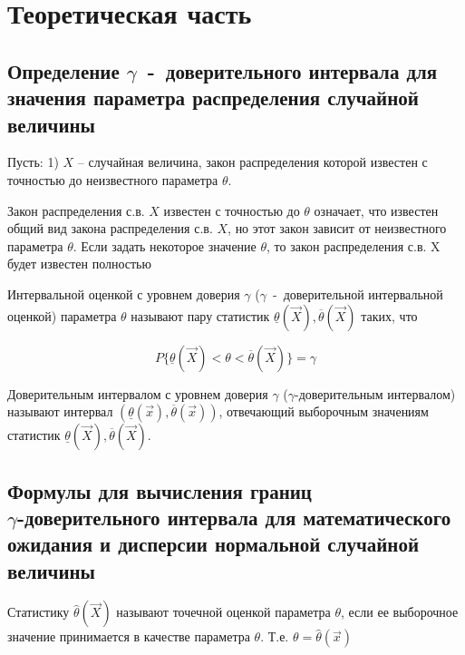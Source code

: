 \chapter{Теоретическая часть}

\section{Определение $\gamma$~-~доверительного интервала для значения параметра распределения случайной величины}

Пусть:
1) $X$ -- случайная величина, закон распределения которой
известен с точностью до неизвестного параметра $\theta$.

Закон распределения с.в. $X$ известен с точностью до $\theta$
означает, что известен общий вид закона распределения с.в. $X$, но этот закон
зависит от неизвестного параметра $\theta$.
Если задать некоторое значение $\theta$, 
то закон распределения с.в. X будет известен полностью

Интервальной оценкой с уровнем доверия $\gamma$ 
($\gamma$~-~доверительной интервальной оценкой) 
параметра $\theta$ называют пару статистик 
$\underline{\theta}(\vec X), \overline{\theta}(\vec X)$ таких, что

\begin{equation*}
    P\{\underline{\theta}(\vec X)<\theta<\overline{\theta}(\vec X)\}=\gamma
\end{equation*}


Доверительным интервалом с уровнем доверия $\gamma$ ($\gamma$-доверительным интервалом) называют интервал $(\underline{\theta}(\vec x), \overline{\theta}(\vec x))$, отвечающий выборочным значениям статистик $\underline{\theta}(\vec X), \overline{\theta}(\vec X)$.

\section{Формулы для вычисления границ \\ $\gamma$-доверительного интервала для математического ожидания и дисперсии нормальной случайной величины}

Статистику $\hat{\theta}(\vec{X})$ называют точечной оценкой параметра $\theta$,
если ее выборочное значение принимается в качестве параметра $\theta$.
Т.е. $\theta = \hat{\theta}(\vec{x})$ 

